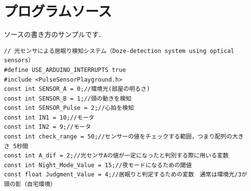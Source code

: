 \documentclass[uplatex,dvipdfmx]{jlreq}
\begin{document}
\section{プログラムソース}

ソースの書き方のサンプルです．

\begin{lstlisting}
// 光センサによる居眠り検知システム（Doze-detection system using optical sensors）
#define USE_ARDUINO_INTERRUPTS true  
#include <PulseSensorPlayground.h>  
const int SENSOR_A = 0;//環境光(部屋の明るさ)
const int SENSOR_B = 1;//頭の動きを検知
const int SENSOR_Pulse = 2;//心拍を検知
const int IN1 = 10;//モータ
const int IN2 = 9;//モータ
const int check_range = 50;//センサーの値をチェックする範囲，つまり配列の大きさ 5秒間
const int A_dif = 2;//光センサAの値が一定になったと判別する際に用いる変数
const int Night_Mode_Value = 15;//夜モードになるための閾値
const float Judgment_Value = 4;//居眠りと判定するための変数　通常は環境光/3が頭の影（自宅環境）
\end{lstlisting}
\end{document}
